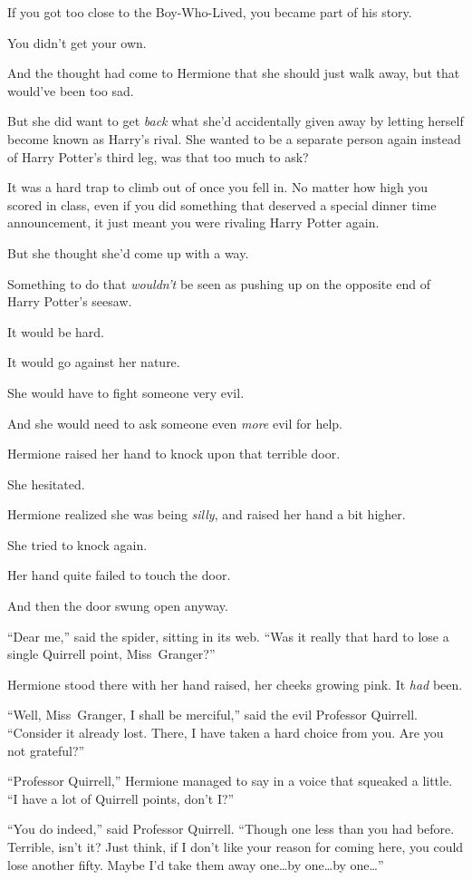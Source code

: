 If you got too close to the Boy-Who-Lived, you became part of his story.

You didn’t get your own.

And the thought had come to Hermione that she should just walk away, but that would’ve been too sad.

But she did want to get \emph{back} what she’d accidentally given away by letting herself become known as Harry’s rival. She wanted to be a separate person again instead of Harry Potter’s third leg, was that too much to ask?

It was a hard trap to climb out of once you fell in. No matter how high you scored in class, even if you did something that deserved a special dinner time announcement, it just meant you were rivaling Harry Potter again.

But she thought she’d come up with a way.

Something to do that \emph{wouldn’t} be seen as pushing up on the opposite end of Harry Potter’s seesaw.

It would be hard.

It would go against her nature.

She would have to fight someone very evil.

And she would need to ask someone even \emph{more} evil for help.

Hermione raised her hand to knock upon that terrible door.

She hesitated.

Hermione realized she was being \emph{silly}, and raised her hand a bit higher.

She tried to knock again.

Her hand quite failed to touch the door.

And then the door swung open anyway.

“Dear me,” said the spider, sitting in its web. “Was it really that hard to lose a single Quirrell point, Miss~Granger?”

Hermione stood there with her hand raised, her cheeks growing pink. It \emph{had} been.

“Well, Miss~Granger, I shall be merciful,” said the evil Professor Quirrell. “Consider it already lost. There, I have taken a hard choice from you. Are you not grateful?”

“Professor Quirrell,” Hermione managed to say in a voice that squeaked a little. “I have a lot of Quirrell points, don’t I?”

“You do indeed,” said Professor Quirrell. “Though one less than you had before. Terrible, isn’t it? Just think, if I don’t like your reason for coming here, you could lose another fifty. Maybe I’d take them away one…by one…by one…”

